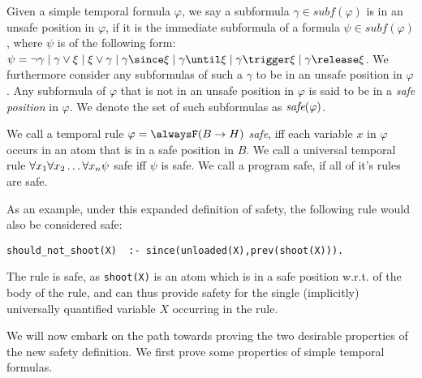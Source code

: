 \begin{definition}[Safety]
  Given a simple temporal formula $\varphi$, we say a subformula
  $\gamma \in subf(\varphi)$ is in an unsafe position in $\varphi$, if
  it is the immediate subformula of a formula
  $\psi \in subf(\varphi)$, where $\psi$ is of the following form:
  $\psi = \neg \gamma \mid \gamma \vee \xi \mid \xi \vee \gamma \mid
  \gamma \since \xi \mid \gamma \until \xi \mid \gamma \trigger \xi \mid
  \gamma \release \xi$. We furthermore consider any subformulas of
  such a $\gamma$ to be in an unsafe position in $\varphi$. Any
  subformula of $\varphi$ that is not in an unsafe position in
  $\varphi$ is said to be in a \textit{safe position} in $\varphi$. We
  denote the set of such subformulas as $\textit{safe}(\varphi)$.

  We call a temporal rule $\varphi = \alwaysF(B \rightarrow H)$
  \emph{safe}, iff each variable $x$ in $\varphi$ occurs in an atom
  that is in a safe position in $B$. We call a universal temporal rule
  $\forall x_1 \forall x_2 \dots \forall x_n \psi$ safe iff $\psi$ is safe. We call a program safe, if
  all of it's rules are safe.
\end{definition}

As an example, under this expanded definition of safety, the following
rule would also be considered safe:

\begin{center}
    \begin{lstlisting}[numbers=none]
should_not_shoot(X)  :- since(unloaded(X),prev(shoot(X))).
    \end{lstlisting}
\end{center}

The rule is safe, as \verb|shoot(X)| is an atom which is in a safe
position w.r.t. of the body of the rule, and can thus provide safety
for the single (implicitly) universally quantified variable $X$
occurring in the rule.

We will now embark on the path towards proving the two desirable
properties of the new safety definition. We first prove some
properties of simple temporal formulas.

